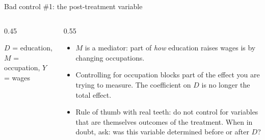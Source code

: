 \documentclass[aspectratio=169,11pt]{beamer}
\begin{document}
\begin{frame}{Bad control \#1: the post-treatment variable}
\begin{columns}
\begin{column}{0.45\textwidth}
\begin{center}
\end{center}
\smallskip
{\small $D$ = education, $M$ = occupation, $Y$ = wages}
\end{column}
\begin{column}{0.55\textwidth}
\begin{itemize}
	\item $M$ is a \alert{mediator}: part of \emph{how} education raises wages is by
	changing occupations.

	\item Controlling for occupation \alert{blocks part of the effect you are trying
	to measure}. The coefficient on $D$ is no longer the total effect.

	\item Rule of thumb with real teeth: \alert{do not control for variables that are
	themselves outcomes of the treatment}. When in doubt, ask: was this variable
	determined before or after $D$?
\end{itemize}
\end{column}
\end{columns}
\end{frame}
\end{document}
